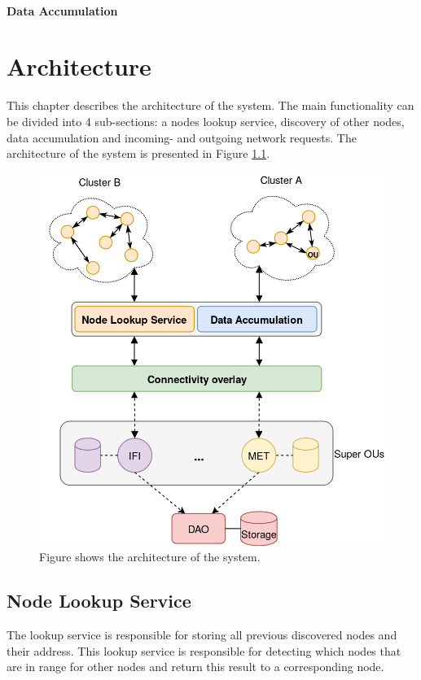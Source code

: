 \documentclass[USenglish]{uit-thesis}
\begin{document}
\subsubsection{Data Accumulation}




\chapter{Architecture}

This chapter describes the architecture of the system. The main functionality can be divided into 4 sub-sections: a nodes lookup service, discovery of other nodes, data accumulation and incoming- and outgoing network requests. The architecture of the system is presented in Figure \ref{fig:architecture3}.


\begin{figure}
\centering
\includegraphics[width=\textwidth]{arch3.png}
\caption{Figure shows the architecture of the system.}
\label{fig:architecture3}
\end{figure}

\section{Node Lookup Service} \label{sec:nodeLS}
The lookup service is responsible for storing all previous discovered nodes and their address. This lookup service is responsible for detecting which nodes that are in range for other nodes and return this result to a corresponding node. 
\end{document}
